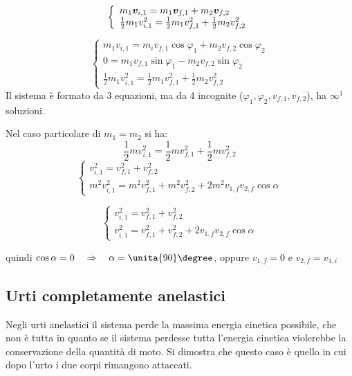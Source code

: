 $$\left\{
\begin{array}{l}
m_1\boldsymbol{v}_{i,1}=m_1\boldsymbol{v}_{f,1}+m_2\boldsymbol{v}_{f,2}\\
\frac{1}{2}m_1 v_{i,1}^2=\frac{1}{2}m_1 v_{f,1}^2+\frac{1}{2}m_2
v_{f,2}^2
\end{array}\right.$$

$$\left\{
\begin{array}{l}
m_1v_{i,1}=m_iv_{f,1}\cos\varphi_1+m_2v_{f,2}\cos\varphi_2\\
0=m_1v_{f,1}\sin\varphi_1-m_2v_{f,2}\sin\varphi_2\\
\frac{1}{2}m_1 v_{i,1}^2=\frac{1}{2}m_1 v_{f,1}^2+\frac{1}{2}m_2
v_{f,2}^2
\end{array}\right.$$
Il sistema è formato da 3 equazioni, ma da 4 incognite
($\varphi_1, \varphi_2, v_{f,1}, v_{f,2}$), ha $\infty^1$
soluzioni.

Nel caso particolare di $m_1=m_2$ si ha:
$$\frac{1}{2}m v_{i,1}^2=\frac{1}{2}m
v_{f,1}^2+\frac{1}{2}m v_{f,2}^2$$
$$\left\{
\begin{array}{l}
v_{i,1}^2=v_{f,1}^2+v_{f,2}^2\\
m^2v_{i,1}^2=m^2v_{f,1}^2+m^2v_{f,2}^2+2m^2v_{1,f}v_{2,f}\cos\alpha
\end{array}
\right.$$

$$\left\{
\begin{array}{l}
v_{i,1}^2=v_{f,1}^2+v_{f,2}^2\\
v_{i,1}^2=v_{f,1}^2+v_{f,2}^2+2v_{1,f}v_{2,f}\cos\alpha
\end{array}
\right.$$

quindi $\cos \alpha=0\quad\Rightarrow\quad\alpha=\unita{90}\degree$, oppure $v_{1,f}=0$ e $v_{2,f}=v_{1,i}$

\subsection{Urti completamente anelastici}

Negli urti anelastici il sistema perde la massima energia cinetica possibile, che non è tutta
in quanto se il sistema perdesse tutta l'energia cinetica violerebbe la conservazione
della quantità di moto. Si dimostra che questo caso è quello in cui dopo l'urto i due corpi
rimangono attaccati.

